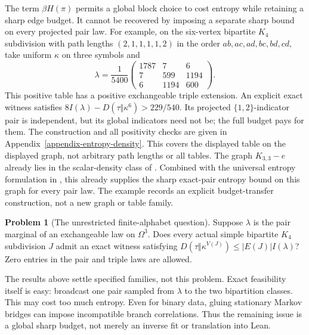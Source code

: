 \documentclass[a4paper,11pt,reqno]{amsart}
\theoremstyle{plain}
\theoremstyle{definition}
\newtheorem{problem}[theorem]{Problem}
\theoremstyle{remark}
\begin{document}
The term $\beta H(\pi)$ permits a global block choice to cost entropy
while retaining a sharp edge budget.  It cannot be recovered by imposing
a separate sharp bound on every projected pair law.  For example, on the
six-vertex bipartite $K_4$ subdivision with path lengths
$(2,1,1,1,1,2)$ in the order $ab,ac,ad,bc,bd,cd$, take uniform
$\kappa$ on three symbols and
\begin{equation}\label{eq-three-colour-budget-transfer}
 \lambda=\frac1{5400}
 \begin{pmatrix}1787&7&6\\7&599&1194\\6&1194&600\end{pmatrix}.
\end{equation}
This positive table has a positive exchangeable triple extension.  An
explicit exact witness satisfies $8I(\lambda)-D(\tau\Vert\kappa^6)
>229/540$.  Its projected $\{1,2\}$-indicator pair is independent,
but its global indicators need not be; the full budget pays for them.
The construction and all positivity checks are given in
Appendix~\ref{appendix-entropy-density}.  This covers the displayed
table on the displayed graph, not arbitrary path lengths or all tables.
The graph $K_{3,3}-e$ already lies in the scalar-density class of
\citet{conlonfoxsudakov2012}.  Combined with the universal entropy
formulation in \citet[Corollary~9.1]{szegedy2015}, this already supplies
the sharp exact-pair entropy bound on this graph for every pair law.
The example records an explicit budget-transfer construction, not a new
graph or table family.

\begin{problem}[The unrestricted finite-alphabet question]
\label{problem-unrestricted-alphabet}
Suppose $\lambda$ is the pair marginal of an exchangeable law on
$\Omega^3$.  Does every actual simple bipartite $K_4$ subdivision $J$
admit an exact witness satisfying
$D(\tau\Vert\kappa^{V(J)})\le |E(J)|I(\lambda)$?
Zero entries in the pair and triple laws are allowed.
\end{problem}

The results above settle specified families, not this problem.  Exact
feasibility itself is easy: broadcast one pair sampled from $\lambda$
to the two bipartition classes.  This may cost too much entropy.  Even
for binary data, gluing stationary Markov bridges can impose incompatible
branch correlations.  Thus the remaining issue is a global sharp budget,
not merely an inverse fit or translation into Lean.
\end{document}
